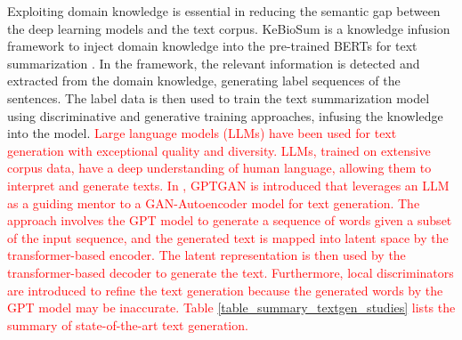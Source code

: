 \documentclass[preprint,12pt]{elsarticle}
\begin{document}
Exploiting domain knowledge is essential in reducing the semantic gap between the deep learning models and the text corpus. KeBioSum is a knowledge infusion framework to inject domain knowledge into the pre-trained BERTs for text summarization \citep{xie_pre-trained_2022}. In the framework, the relevant information is detected and extracted from the domain knowledge, generating label sequences of the sentences. The label data is then used to train the text summarization model using discriminative and generative training approaches, infusing the knowledge into the model. \textcolor{red}{Large language models (LLMs) have been used for text generation with exceptional quality and diversity. LLMs, trained on extensive corpus data, have a deep understanding of human language, allowing them to interpret and generate texts. In \citep{hajipoor_gptgan_2025}, GPTGAN is introduced that leverages an LLM as a guiding mentor to a GAN-Autoencoder model for text generation. The approach involves the GPT model to generate a sequence of words given a subset of the input sequence, and the generated text is mapped into latent space by the transformer-based encoder. The latent representation is then used by the transformer-based decoder to generate the text. Furthermore, local discriminators are introduced to refine the text generation because the generated words by the GPT model may be inaccurate. Table \ref{table_summary_textgen_studies} lists the summary of state-of-the-art text generation.}
\end{document}
